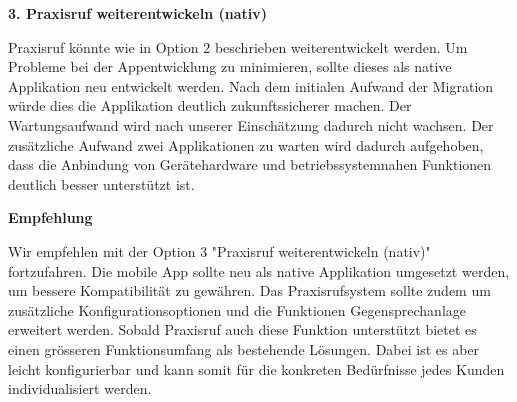 \textbf{3. Praxisruf weiterentwickeln (nativ) }

Praxisruf könnte wie in Option 2 beschrieben weiterentwickelt werden.
Um Probleme bei der Appentwicklung zu minimieren, sollte dieses als native Applikation neu entwickelt werden.
Nach dem initialen Aufwand der Migration würde dies die Applikation deutlich zukunftssicherer machen.
Der Wartungsaufwand wird nach unserer Einschätzung dadurch nicht wachsen.
Der zusätzliche Aufwand zwei Applikationen zu warten wird dadurch aufgehoben, dass die Anbindung von Gerätehardware
und betriebssystemnahen Funktionen deutlich besser unterstützt ist.

\textbf{Empfehlung}

Wir empfehlen mit der Option 3 "Praxisruf weiterentwickeln (nativ)" fortzufahren.
Die mobile App sollte neu als native Applikation umgesetzt werden, um bessere Kompatibilität zu gewähren.
Das Praxisrufsystem sollte zudem um zusätzliche Konfigurationsoptionen und die Funktionen Gegensprechanlage erweitert werden.
Sobald Praxisruf auch diese Funktion unterstützt bietet es einen grösseren Funktionsumfang als bestehende Lösungen.
Dabei ist es aber leicht konfigurierbar und kann somit für die konkreten Bedürfnisse jedes Kunden individualisiert werden.

\clearpage
